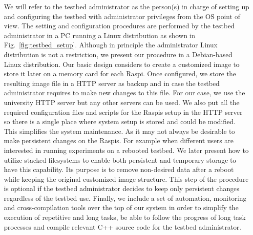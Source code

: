 We will refer to the
testbed administrator as the person(s) in charge of setting up and
configuring the testbed with administrator privileges from the \ac{OS}
point of view. The setting and configuration procedures are
performed by the testbed administrator in a \ac{PC} running a
Linux distribution as shown in Fig.~\ref{fig:testbed_setup}. Although in principle the administrator
Linux distribution is not a restriction, we present our procedure in a
Debian-based Linux distribution. Our basic design considers to create
a customized image to store it later on a memory card for each \ac{Raspi}.
Once configured, we store the resulting image file in a \ac{HTTP} server
as backup and in case the testbed administrator requires to make new
changes to this file. For our case, we use the university \ac{HTTP} server but any other servers can be used. We also put all the required configuration files
and scripts for the \ac{Raspi}s setup in the \ac{HTTP} server so there is
a single place where system setup is stored and could be modified.
This simplifies the system maintenance.
As
it may not always be desirable to make persistent changes
on the \ac{Raspi}s. For example when different users are interested in
running experiments on a rebooted testbed. We later present how
to utilize stacked filesystems to enable both persistent and
temporary storage to have this capability. Its purpose is to
remove non-desired data after a reboot while keeping the original
customized image structure. This step of the procedure is optional if
the testbed administrator decides to keep only persistent changes regardless
of the testbed use. Finally, we include a set of automation, monitoring
and cross-compilation tools over the top of our system in order to simplify
the execution of repetitive and long tasks, be able to follow the progress
of long task processes and compile relevant C++ source code for the testbed
administrator.


